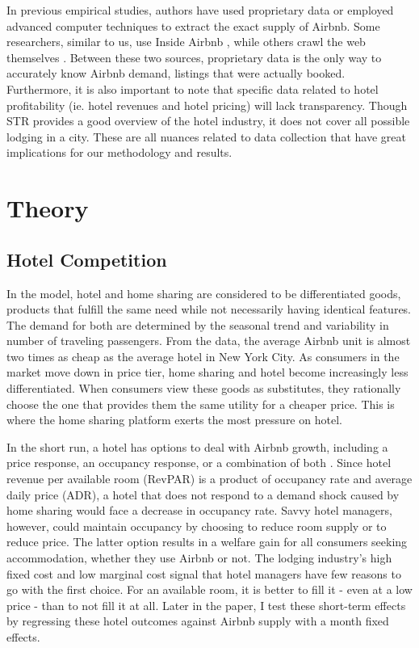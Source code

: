 \documentclass[12pt]{article}
\begin{document}
			\par
			In previous empirical studies, authors have used proprietary data or employed advanced computer techniques to extract the exact supply of Airbnb. Some researchers, similar to us, use Inside Airbnb \citep{coles2017airbnb, gurran2017tourists, kakar2018visible}, while others crawl the web themselves \citep{barron2018sharing, zervas2017rise}. Between these two sources, proprietary data is the only way to accurately know Airbnb demand, listings that were actually booked. Furthermore, it is also important to note that specific data related to hotel profitability (ie. hotel revenues and hotel pricing) will lack transparency. Though STR provides a good overview of the hotel industry, it does not cover all possible lodging in a city. These are all nuances related to data collection that have great implications for our methodology and results.
			
	\section{Theory} %
		\subsection{Hotel Competition}
			In the model, hotel and home sharing are considered to be differentiated goods, products that fulfill the same need while not necessarily having identical features. The demand for both are determined by the seasonal trend and variability in number of traveling passengers. From the data, the average Airbnb unit is almost two times as cheap as the average hotel in New York City. As consumers in the market move down in price tier, home sharing and hotel become increasingly less differentiated. When consumers view these goods as substitutes, they rationally choose the one that provides them the same utility for a cheaper price. This is where the home sharing platform exerts the most pressure on hotel.
			
			\par
			In the short run, a hotel has options to deal with Airbnb growth, including a price response, an occupancy response, or a combination of both \citep{zervas2017rise}. Since hotel revenue per available room (RevPAR) is a product of occupancy rate and average daily price (ADR), a hotel that does not respond to a demand shock caused by home sharing would face a decrease in occupancy rate. Savvy hotel managers, however, could maintain occupancy by choosing to reduce room supply or to reduce price. The latter option results in a welfare gain for all consumers seeking accommodation, whether they use Airbnb or not. The lodging industry's high fixed cost and low marginal cost signal that hotel managers have few reasons to go with the first choice. For an available room, it is better to fill it - even at a low price - than to not fill it at all. Later in the paper, I test these short-term effects by regressing these hotel outcomes against Airbnb supply with a month fixed effects.
\end{document}
